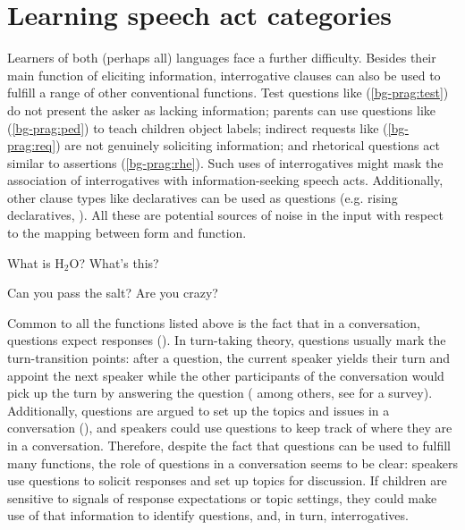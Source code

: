 \chapter{Learning speech act categories}
\label{chap:eng-sp}


Learners of both (perhaps all) languages face a further difficulty. Besides their main function of eliciting information, interrogative clauses can also be used to fulfill a range of other conventional functions. Test questions like (\ref{bg-prag:test}) do not present the asker as lacking information; parents can use questions like (\ref{bg-prag:ped}) to teach children object labels; indirect requests like (\ref{bg-prag:req}) are not genuinely soliciting information; and rhetorical questions act similar to assertions (\ref{bg-prag:rhe}). Such uses of interrogatives might mask the association of interrogatives with information-seeking speech acts. Additionally, other clause types like declaratives can be used as questions (e.g. rising declaratives, \citealt{gunlogson2004,gunlogson2008,jeong2018,rudin2018}). All these are potential sources of noise in the input with respect to the mapping between form and function.

\bxl\label{bg-prag:test}
What is H$_{2}$O?		\hfill {}
\ex \label{bg-prag:ped}
What's this?	\hfill {}
\exl
\eex

\bex{}
\bxl\label{bg-prag:req}
Can you pass the salt?			\hfill {}
\ex \label{bg-prag:rhe}
Are you crazy?	\hfill {}
\exl
\eex


Common to all the functions listed above is the fact that in a conversation, questions expect responses (\citealt{duncan1972turn}). In turn-taking theory, questions usually mark the turn-transition points: after a question, the current speaker yields their turn and appoint the next speaker while the other participants of the conversation would pick up the turn by answering the question (\citealt{kendon1967gaze, argyle1972gaze, levinson1983, tice2011turn} among others, see \citealt{enfield2010} for a survey).  Additionally, questions are argued to set up the topics and issues in a conversation (\citealt{roberts2012,farkasbruce2010}), and speakers could use questions to keep track of where they are in a conversation. Therefore, despite the fact that questions can be used to fulfill many functions, the role of questions in a conversation seems to be clear: speakers use questions to solicit responses and set up topics for discussion. If children are sensitive to signals of response expectations or topic settings, they could make use of that information to identify questions, and, in turn, interrogatives. 



